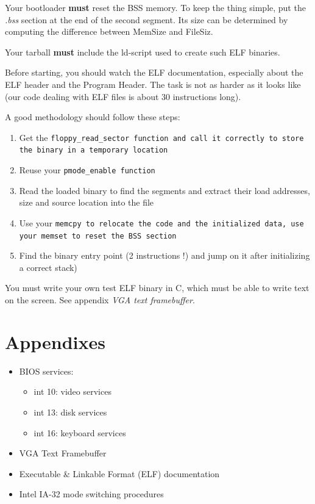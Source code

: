 Your bootloader \textbf{must} reset the BSS memory. To keep the thing
simple, put the \emph{.bss} section at the end of the second
segment. Its size can be determined by computing the difference
between MemSize and FileSiz.

Your tarball \textbf{must} include the ld-script used to create such
ELF binaries.

Before starting, you should watch the ELF documentation, especially
about the ELF header and the Program Header. The task is not as harder
as it looks like (our code dealing with ELF files is about 30
instructions long).

A good methodology should follow these steps:

  \begin{enumerate}

    \item {Get the \tt floppy\_read\_sector \rm function and call it
    correctly to store the binary in a temporary location}

    \item {Reuse your \tt pmode\_enable \rm function}

    \item {Read the loaded binary to find the segments and extract
    their load addresses, size and source location into the file}

    \item {Use your \tt memcpy \rm to relocate the code and the
    initialized data, use your \tt memset \rm to reset the BSS section}

    \item {Find the binary entry point (2 instructions !) and jump on
    it after initializing a correct stack)}

  \end{enumerate}

You must write your own test ELF binary in C, which must be able to
write text on the screen. See appendix \emph{VGA text framebuffer}.

\newpage

\section{Appendixes}

\begin{itemize}
\item
  BIOS services:
  \begin{itemize}
  \item
    int 10: video services
  \item
    int 13: disk services
  \item
    int 16: keyboard services
  \end{itemize}
\item
  VGA Text Framebuffer
\item
  Executable \& Linkable Format (ELF) documentation
\item
  Intel IA-32 mode switching procedures
\end{itemize}

